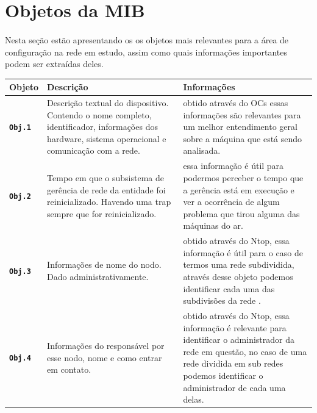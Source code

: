 \documentclass[a4paper]{article}
\begin{document}
  \newpage 
   \section{Objetos da MIB}
   \paragraph{}
   Nesta seção estão apresentando os os objetos mais relevantes para a área de configuração na rede em estudo, assim como quais informações importantes podem ser extraídas deles.
     
   \begin{table}[H]
    \begin{tabu} to 
    \everyrow{\tabucline[.2pt]-}
    \rowfont\bfseries
    Objeto  & Descrição & Informações \\  \hline
    
    \texttt{Obj.1}  & Descrição textual do dispositivo. Contendo o nome completo,  identificador, informações dos hardware, sistema operacional e comunicação com a rede. & obtido através do OCs essas informações são relevantes para um melhor entendimento geral sobre a máquina que está sendo analisada.\\ 
    \texttt{Obj.2}  & Tempo em que o subsistema de gerência de rede da entidade foi reinicializado. Havendo uma trap sempre que for reinicializado. & essa informação é útil para podermos perceber o tempo que a gerência está em execução e ver a ocorrência de algum problema que tirou alguma das máquinas do ar.\\ 
    \texttt{Obj.3}  & Informações de nome do nodo. Dado administrativamente.
 & obtido através do Ntop, essa informação é útil para o caso de termos uma rede subdividida, através desse objeto podemos identificar cada uma das subdivisões da rede .\\ 
    \texttt{Obj.4}  & Informações do responsável por esse nodo, nome e como entrar em contato. &obtido através do Ntop, essa informação é relevante para identificar o administrador da rede em questão, no caso de uma rede dividida em sub redes podemos identificar o administrador de cada uma delas. \\ 
  
    \end{tabu}
    \end{table}
  
\end{document}
